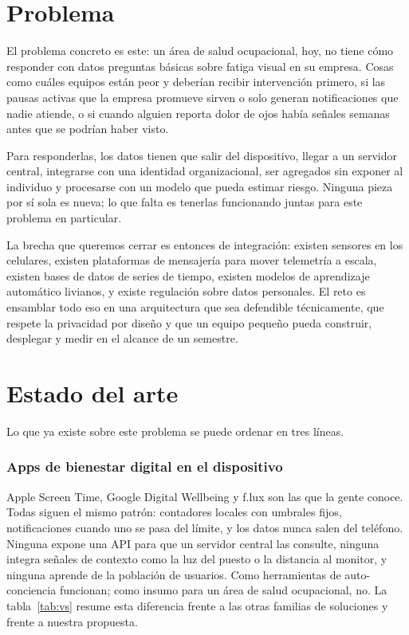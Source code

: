 \documentclass[conference]{IEEEtran}
\begin{document}
\section{Problema}

El problema concreto es este: un área de salud ocupacional, hoy, no tiene 
cómo responder con datos preguntas básicas sobre fatiga visual en su 
empresa. Cosas como cuáles equipos están peor y deberían recibir 
intervención primero, si las pausas activas que la empresa promueve 
sirven o solo generan notificaciones que nadie atiende, o si cuando 
alguien reporta dolor de ojos había señales semanas antes que se 
podrían haber visto.

Para responderlas, los datos tienen que salir del dispositivo, llegar
a un servidor central, integrarse con una identidad organizacional, ser
agregados sin exponer al individuo y procesarse con un modelo que pueda
estimar riesgo. Ninguna pieza por sí sola es nueva; lo que falta es
tenerlas funcionando juntas para este problema en particular.

La brecha que queremos cerrar es entonces de integración: existen 
sensores en los celulares, existen plataformas de mensajería para mover 
telemetría a escala, existen bases de datos de series de tiempo, existen 
modelos de aprendizaje automático livianos, y existe regulación sobre 
datos personales. El reto es ensamblar todo eso en una arquitectura que 
sea defendible técnicamente, que respete la privacidad por diseño y que 
un equipo pequeño pueda construir, desplegar y medir en el alcance de 
un semestre.

\section{Estado del arte}

Lo que ya existe sobre este problema se puede ordenar en tres líneas.

\subsubsection*{Apps de bienestar digital en el dispositivo}

Apple Screen Time, Google Digital Wellbeing y f.lux son las que la gente 
conoce. Todas siguen el mismo patrón: contadores locales con umbrales 
fijos, notificaciones cuando uno se pasa del límite, y los datos nunca 
salen del teléfono. Ninguna expone una API para que un servidor central 
las consulte, ninguna integra señales de contexto como la luz del puesto 
o la distancia al monitor, y ninguna aprende de la población de usuarios. 
Como herramientas de auto-conciencia funcionan; como insumo para un área 
de salud ocupacional, no. La tabla~\ref{tab:vs} resume esta diferencia 
frente a las otras familias de soluciones y frente a nuestra propuesta.
\end{document}
